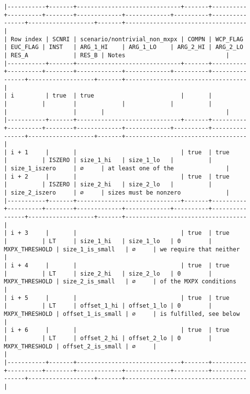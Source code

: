 \documentclass[varwidth=\maxdimen,margin=0.5cm,multi={verbatim}]{standalone}
\begin{document}
\begin{verbatim}
|-----------+-------+------------------------------+-------+----------+----------+--------+-------------+-------------+----------+----------------+-------------------+-------+-----------------------------------|
| Row index | SCNRI | scenario/nontrivial_non_mxpx | COMPN | WCP_FLAG | EUC_FLAG | INST   | ARG_1_HI    | ARG_1_LO    | ARG_2_HI | ARG_2_LO       | RES_A             | RES_B | Notes                             |
|-----------+-------+------------------------------+-------+----------+----------+--------+-------------+-------------+----------+----------------+-------------------+-------+-----------------------------------|
| i         | true  | true                         |       |          |          |        |             |             |          |                |                   |       |                                   |
|-----------+-------+------------------------------+-------+----------+----------+--------+-------------+-------------+----------+----------------+-------------------+-------+-----------------------------------|
| i + 1     |       |                              | true  | true     |          | ISZERO | size_1_hi   | size_1_lo   |          |                | size_1_iszero     | ∅     | at least one of the               |
| i + 2     |       |                              | true  | true     |          | ISZERO | size_2_hi   | size_2_lo   |          |                | size_2_iszero     | ∅     | sizes must be nonzero             |
|-----------+-------+------------------------------+-------+----------+----------+--------+-------------+-------------+----------+----------------+-------------------+-------+-----------------------------------|
| i + 3     |       |                              | true  | true     |          | LT     | size_1_hi   | size_1_lo   | 0        | MXPX_THRESHOLD | size_1_is_small   | ∅     | we require that neither           |
| i + 4     |       |                              | true  | true     |          | LT     | size_2_hi   | size_2_lo   | 0        | MXPX_THRESHOLD | size_2_is_small   | ∅     | of the MXPX conditions            |
| i + 5     |       |                              | true  | true     |          | LT     | offset_1_hi | offset_1_lo | 0        | MXPX_THRESHOLD | offset_1_is_small | ∅     | is fulfilled, see below           |
| i + 6     |       |                              | true  | true     |          | LT     | offset_2_hi | offset_2_lo | 0        | MXPX_THRESHOLD | offset_2_is_small | ∅     |                                   |
|-----------+-------+------------------------------+-------+----------+----------+--------+-------------+-------------+----------+----------------+-------------------+-------+-----------------------------------|

\end{verbatim}
\end{document}
